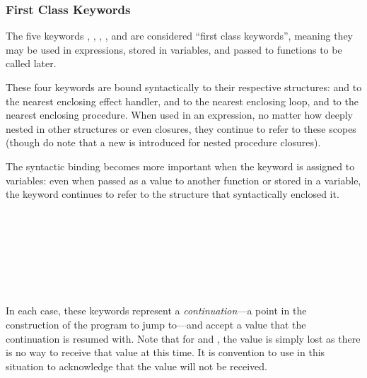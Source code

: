 \subsubsection{First Class Keywords}
\label{sec:first-class-keyword}

The five keywords , , , , and  are
considered ``first class keywords'', meaning they may be used in expressions,
stored in variables, and passed to functions to be called later.

These four keywords are bound syntactically to their respective structures:
 and  to the nearest enclosing effect handler,  and 
to the nearest enclosing loop, and  to the nearest enclosing procedure.
When used in an expression, no matter how deeply nested in other structures or even
closures, they continue to refer to these scopes (though do note that a new 
is introduced for nested procedure closures).

The syntactic binding becomes more important when the keyword is assigned to variables:
even when passed as a value to another function or stored in a variable, the keyword
continues to refer to the structure that syntactically enclosed it.

\begin{bnf*}
     \\
     \\
     \\
     \\
     \\
     \\
\end{bnf*}

In each case, these keywords represent a \emph{continuation}---a point in the
construction of the program to jump to---and accept a value that the continuation is
resumed with. Note that for  and , the value is simply lost as
there is no way to receive that value at this time. It is convention to use 
in this situation to acknowledge that the value will not be received.

